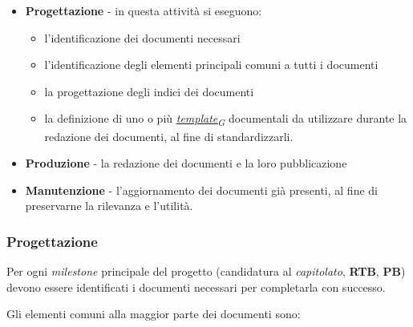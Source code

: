 \documentclass[12pt, a4paper]{article}
\newcommand{\urlglossario}{https://skynetunigroup.github.io/Code_Guardian/Documentazione/RTB/glossario_v1.0.0.pdf} %
\newcommand{\glo}[2]{\href{\urlglossario\#nameddest=#2}{#1\textsubscript{G}}}
\begin{document}
\begin{itemize}
    \item \textbf{Progettazione} - in questa attività si eseguono:
    \begin{itemize}
        \item l'identificazione dei documenti necessari
        \item l'identificazione degli elementi principali comuni a tutti i documenti
        \item la progettazione degli indici dei documenti
        \item la definizione di uno o più \textit{\glo{template}{template}} documentali da utilizzare durante la redazione dei documenti, al fine di standardizzarli.
    \end{itemize}

    \item \textbf{Produzione} - la redazione dei documenti e la loro pubblicazione

    \item \textbf{Manutenzione} - l'aggiornamento dei documenti già presenti, al fine di preservarne la rilevanza e l'utilità.
\end{itemize}

\subsubsection{Progettazione}

Per ogni \textit{milestone} principale del progetto (candidatura al \textit{capitolato}, \textbf{RTB}, \textbf{PB}) devono essere identificati i documenti necessari per completarla con successo.

Gli elementi comuni alla maggior parte dei documenti sono: 
\end{document}

